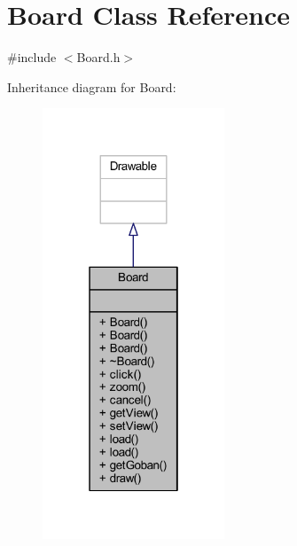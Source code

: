 \hypertarget{class_board}{}\section{Board Class Reference}
\label{class_board}


{\ttfamily \#include $<$Board.\+h$>$}



Inheritance diagram for Board\+:\nopagebreak
\begin{figure}[H]
\begin{center}
\leavevmode
\includegraphics[width=154pt]{class_board__inherit__graph}
\end{center}
\end{figure}


